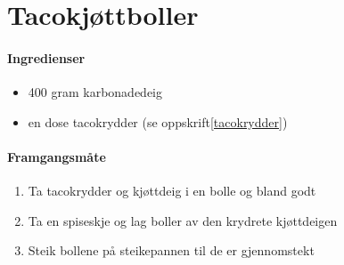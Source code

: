 \section{Tacokjøttboller}

\paragraph{Ingredienser}
\begin{itemize}[noitemsep]
	\item 400 gram karbonadedeig
	\item en dose tacokrydder (se oppskrift\ref{tacokrydder})
\end{itemize}

\paragraph{Framgangsmåte}
\begin{enumerate}[noitemsep]
	\item Ta tacokrydder og kjøttdeig i en bolle og bland godt
	\item Ta en spiseskje og lag boller av den krydrete kjøttdeigen
	\item Steik bollene på steikepannen til de er gjennomstekt
\end{enumerate}
